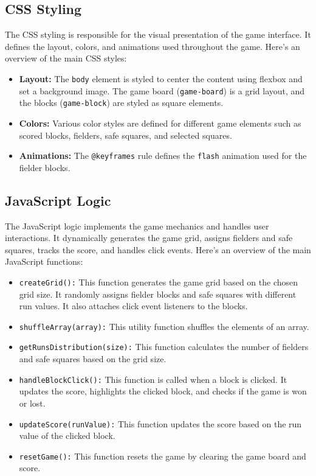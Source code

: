 \documentclass{article}
\begin{document}
\subsection{CSS Styling}

The CSS styling is responsible for the visual presentation of the game interface. It defines the layout, colors, and animations used throughout the game. Here's an overview of the main CSS styles:

\begin{itemize}
  \item \textbf{Layout:} The \texttt{body} element is styled to center the content using flexbox and set a background image. The game board (\texttt{game-board}) is a grid layout, and the blocks (\texttt{game-block}) are styled as square elements.
  \item \textbf{Colors:} Various color styles are defined for different game elements such as scored blocks, fielders, safe squares, and selected squares.
  \item \textbf{Animations:} The \texttt{@keyframes} rule defines the \texttt{flash} animation used for the fielder blocks.
\end{itemize}

\subsection{JavaScript Logic}

The JavaScript logic implements the game mechanics and handles user interactions. It dynamically generates the game grid, assigns fielders and safe squares, tracks the score, and handles click events. Here's an overview of the main JavaScript functions:

\begin{itemize}
  \item \texttt{createGrid():} This function generates the game grid based on the chosen grid size. It randomly assigns fielder blocks and safe squares with different run values. It also attaches click event listeners to the blocks.
  \item \texttt{shuffleArray(array):} This utility function shuffles the elements of an array.
  \item \texttt{getRunsDistribution(size):} This function calculates the number of fielders and safe squares based on the grid size.
  \item \texttt{handleBlockClick():} This function is called when a block is clicked. It updates the score, highlights the clicked block, and checks if the game is won or lost.
  \item \texttt{updateScore(runValue):} This function updates the score based on the run value of the clicked block.
  \item \texttt{resetGame():} This function resets the game by clearing the game board and score.
\end{itemize}
\end{document}
